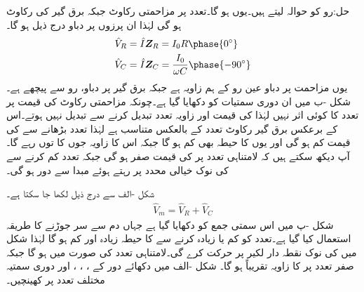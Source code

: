 حل:رو کو حوالہ لیتے ہیں۔یوں  ہو گا۔تعدد  پر مزاحمتی رکاوٹ  جبکہ  برق گیر کی رکاوٹ  ہو گی لہٰذا ان پرزوں پر دباو درج ذیل ہو گا۔
\begin{align*}
\hat{V}_R&=\hat{I} \bZ_R=I_0 R \phase{0^{\circ}}\\
\hat{V}_C&=\hat{I} \bZ_C=\frac{I_0}{ \omega C} \phase{-90^{\circ}}
\end{align*}
یوں مزاحمت پر دباو عین رو کے ہم زاویہ ہے جبکہ برق گیر پر دباو، رو سے  پیچھے ہے۔شکل -ب میں ان دوری سمتیات کو دکھایا گیا ہے۔چونکہ مزاحمتی رکاوٹ کی قیمت پر تعدد کا کوئی اثر نہیں لہٰذا  کی قیمت اور زاویہ تعدد تبدیل کرنے سے تبدیل نہیں ہوتے۔اس کے برعکس برق گیر رکاوٹ تعدد کے بالعکس متناسب ہے لہٰذا تعدد بڑھانے سے  کی قیمت کم ہو گی اور یوں  کا حیطہ بھی کم ہو گا جبکہ اس کا زاویہ جوں کا توں رہے گا۔آپ دیکھ سکتے ہیں کہ لامتناہی تعدد پر  کی قیمت صفر ہو گی جبکہ تعدد کم کرنے سے  کی نوک خیالی محدد پر رہتے ہوئے  مبدا سے دور ہو گی۔

شکل -الف سے درج ذیل لکھا جا سکتا ہے۔
\begin{align*}
\hat{V}_m=\hat{V}_R+\hat{V}_C
\end{align*}
شکل -پ میں اس سمتی جمع کو دکھایا گیا ہے جہاں دم سے سر جوڑنے کا طریقہ استعمال کیا گیا ہے۔تعدد کو کم یا زیادہ کرنے  سے  کا حیطہ زیادہ اور کم ہو گا لہٰذا شکل میں  کی نوک نقطہ دار لکیر پر حرکت کرے گی۔لامتناہی تعدد کی صورت میں  ہو گا جبکہ صفر  تعدد پر  کا زاویہ تقریباً  ہو گا۔ 
شکل -الف  میں دکھائے دور کے  ، ، ،  اور  دوری سمتیہ مختلف تعدد پر کھینچیں۔

